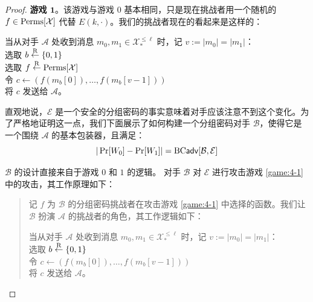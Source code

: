\begin{proof}
\noindent
\textbf{游戏 $\mathbf{1}$}。该游戏与游戏 $0$ 基本相同，只是现在挑战者用一个随机的 $f\in{\rm Perms}[\mathcal{X}]$ 代替 $E(k,\cdot)$。我们的挑战者现在的看起来是这样的：

\vspace*{5pt}

\hspace*{5pt} 当从对手 $\mathcal{A}$ 处收到消息 $m_0,m_1\in\mathcal{X}_*^{\leq\ell}$ 时，记 $v:=|m_0|=|m_1|$：\\
\hspace*{50pt} 选取 $b\overset{\rm R}\leftarrow\{0,1\}$\\
\hspace*{50pt} 选取 $f\overset{\rm R}\leftarrow{\rm Perms}[\mathcal{X}]$\\
\hspace*{50pt} 令 $c\leftarrow(f(m_b[0]),\dots,f(m_b[v-1]))$\\
\hspace*{50pt} 将 $c$ 发送给 $\mathcal{A}$。

\vspace*{5pt}

直观地说，$\mathcal{E}$ 是一个安全的分组密码的事实意味着对手应该注意不到这个变化。为了严格地证明这一点，我们下面展示了如何构建一个分组密码对手 $\mathcal{B}$，使得它是一个围绕 $\mathcal{A}$ 的基本包装器，且满足：
\begin{equation}\label{eq:4-6}
|\Pr[W_0]-\Pr[W_1]|={\rm BC\mathsf{adv}}[\mathcal{B},\mathcal{E}]
\end{equation}

$\mathcal{B}$ 的设计直接来自于游戏 $0$ 和 $1$ 的逻辑。 对手 $\mathcal{B}$ 对 $\mathcal{E}$ 进行攻击游戏 \ref{game:4-1} 中的攻击，其工作原理如下：
\begin{quote}
记 $f$ 为 $\mathcal{B}$ 的分组密码挑战者在攻击游戏 \ref{game:4-1} 中选择的函数。我们让 $\mathcal{B}$ 扮演 $\mathcal{A}$ 的挑战者的角色，其工作逻辑如下：

\vspace*{5pt}

\hspace*{20pt} 当从对手 $\mathcal{A}$ 处收到消息 $m_0,m_1\in\mathcal{X}_*^{\leq\ell}$ 时，记 $v:=|m_0|=|m_1|$：\\
\hspace*{50pt} 选取 $b\overset{\rm R}\leftarrow\{0,1\}$\\
\hspace*{50pt} 令 $c\leftarrow(f(m_b[0]),\dots,f(m_b[v-1]))$\\
\hspace*{50pt} 将 $c$ 发送给 $\mathcal{A}$。


\end{quote}
\end{proof}
